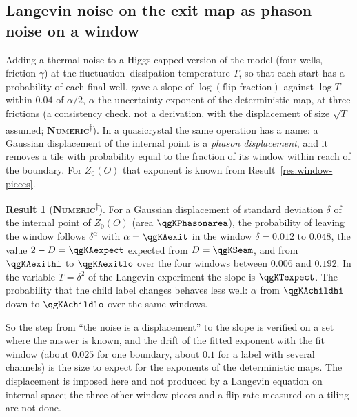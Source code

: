 \documentclass[11pt]{article}
\newcommand{\numeric}{\textbf{\textsc{Numeric}}}
\newcommand{\snap}{\textsuperscript{$\dagger$}}      %
\theoremstyle{definition}
\newtheorem{result}{Result}
\begin{document}
\subsection{Langevin noise on the exit map as phason noise on a window}\label{sec:ym-langevin}
Adding a thermal noise to a Higgs-capped version of the model (four wells, friction $\gamma$) at the fluctuation--dissipation temperature $T$, so that each start has a probability of each final well, gave a slope of $\log(\text{flip fraction})$ against $\log T$ within $0.04$ of $\alpha/2$, $\alpha$ the uncertainty exponent of the deterministic map, at three frictions (a consistency check, not a derivation, with the displacement of size $\sqrt T$ assumed; \numeric\snap). In a quasicrystal the same operation has a name: a Gaussian displacement of the internal point is a \emph{phason displacement}, and it removes a tile with probability equal to the fraction of its window within reach of the boundary. For $Z_0(O)$ that exponent is known from Result~\ref{res:window-pieces}.
\begin{result}[\numeric\snap]\label{res:phason}
For a Gaussian displacement of standard deviation $\delta$ of the internal point of $Z_0(O)$ (area $\qgKPhasonarea$), the probability of leaving the window follows $\delta^{\alpha}$ with $\alpha=\qgKAexit$ in the window $\delta=0.012$ to $0.048$, the value $2-D=\qgKAexpect$ expected from $D=\qgKSeam$, and from $\qgKAexithi$ to $\qgKAexitlo$ over the four windows between $0.006$ and $0.192$. In the variable $T=\delta^2$ of the Langevin experiment the slope is $\qgKTexpect$. The probability that the child label changes behaves less well: $\alpha$ from $\qgKAchildhi$ down to $\qgKAchildlo$ over the same windows.
\end{result}
So the step from ``the noise is a displacement'' to the slope is verified on a set where the answer is known, and the drift of the fitted exponent with the fit window (about $0.025$ for one boundary, about $0.1$ for a label with several channels) is the size to expect for the exponents of the deterministic maps. The displacement is imposed here and not produced by a Langevin equation on internal space; the three other window pieces and a flip rate measured on a tiling are not done.
\end{document}
